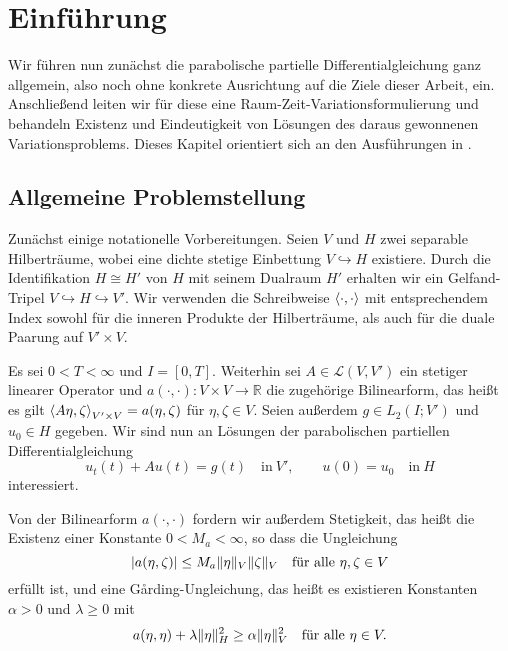 
\chapter{Einführung} %
\label{cha:einfuehrung}

Wir führen nun zunächst die parabolische partielle Differentialgleichung ganz allgemein, also noch ohne konkrete Ausrichtung auf die Ziele dieser Arbeit, ein.
Anschließend leiten wir für diese eine Raum-Zeit-Variationsformulierung und behandeln Existenz und Eindeutigkeit von Lösungen des daraus gewonnenen Variationsproblems.
Dieses Kapitel orientiert sich an den Ausführungen in \cite{Schwab:2009ec, Urban:2014kg}.

\section{Allgemeine Problemstellung} %
\label{sec:allgemeine_problemstellung}

Zunächst einige notationelle Vorbereitungen.
Seien $V$ und $H$ zwei separable Hilberträume, wobei eine dichte stetige Einbettung $V \hookrightarrow H$ existiere.
Durch die Identifikation $H \cong H'$ von $H$ mit seinem Dualraum $H'$ erhalten wir ein Gelfand-Tripel $V \hookrightarrow H \hookrightarrow V'$.
Wir verwenden die Schreibweise $\left\langle\cdot,\cdot\right\rangle$ mit entsprechendem Index sowohl für die inneren Produkte der Hilberträume, als auch für die duale Paarung auf $V' \times V$.

Es sei $0 < T < \infty$ und $I = [0, T]$.
Weiterhin sei $A \in \mathcal L(V, V')$ ein stetiger linearer Operator und $a(\cdot, \cdot) \colon V \times V \to \mathbb{R}$ die zugehörige Bilinearform, das heißt es gilt $\left\langle A \eta,\zeta\right\rangle_{V' \times V} = a(\eta, \zeta)$ für $\eta, \zeta \in V$.
Seien außerdem $g \in L_{2}(I; V')$ und $u_{0} \in H$ gegeben.
Wir sind nun an Lösungen der parabolischen partiellen Differentialgleichung
\begin{equation}
    \label{eq:allgemeine_parabolische_pde}
    u_{t}(t) + A u(t) = g(t) \quad \text{in}~V',
    \qquad
    u(0) = u_{0} \quad \text{in}~H
\end{equation}
interessiert.

Von der Bilinearform $a(\cdot, \cdot)$ fordern wir außerdem Stetigkeit, das heißt die Existenz einer Konstante $0 < M_{a} < \infty$, so dass die Ungleichung
\begin{equation}
    \label{eq:allgemeine_parabolische_pde:bf_stetig}
    \lvert a(\eta, \zeta)\rvert \leq M_{a} \lVert\eta\rVert_{V} \lVert\zeta\rVert_{V} \quad \text{für alle}~\eta, \zeta \in V
\end{equation}
erfüllt ist, und eine G\aa rding-Ungleichung, das heißt es existieren Konstanten $\alpha > 0$ und $\lambda \geq 0$ mit
\begin{equation}
    \label{eq:allgemeine_parabolische_pde:bf_garding}
    a(\eta, \eta) + \lambda \lVert\eta\rVert_{H}^{2} \geq \alpha \lVert\eta\rVert_{V}^{2} \quad \text{für alle}~\eta \in V.
\end{equation}

